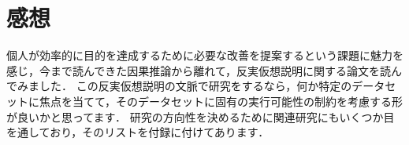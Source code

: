 \documentclass[dvipdfmx]{jreport}
\begin{document}
\section{感想}
個人が効率的に目的を達成するために必要な改善を提案するという課題に魅力を感じ，今まで読んできた因果推論から離れて，反実仮想説明に関する論文を読んでみました．
この反実仮想説明の文脈で研究をするなら，何か特定のデータセットに焦点を当てて，そのデータセットに固有の実行可能性の制約を考慮する形が良いかと思ってます．
研究の方向性を決めるために関連研究にもいくつか目を通しており，そのリストを付録に付けてあります．
\end{document}
